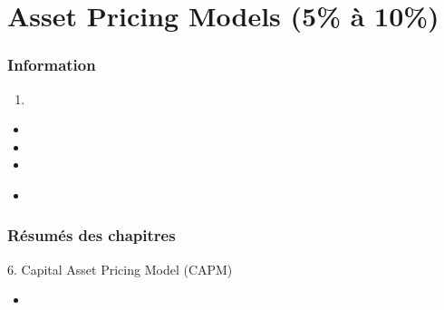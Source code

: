 \documentclass[12pt, titlepage, french]{report}
\begin{document}

\newpage


\chapter[Asset Pricing Models]{Asset Pricing Models (5\% à 10\%)}

\subsection{Information}

\begin{distributions}[Objective]

\end{distributions}

\begin{outcomes}
\begin{enumerate}
	\item	
\end{enumerate}
\end{outcomes}

\begin{ASM_chapter}
\begin{itemize}
	\item	{}
	\item	{}
	\item	{}
\end{itemize}
\end{ASM_chapter}

\begin{YTB_vids}
\begin{itemize}
	\item	
\end{itemize}
\end{YTB_vids}

\subsection{Résumés des chapitres}

\begin{CHPT_SUMM_AUTO}[label = {L.-6}]{6. Capital Asset Pricing Model (CAPM)}
	\begin{itemize}
		\item	
	\end{itemize}
\end{CHPT_SUMM_AUTO}
\end{document}
